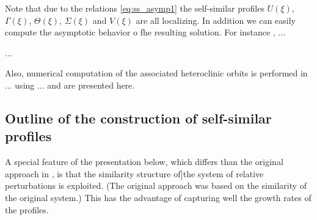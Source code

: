 \documentclass[a4paper,11pt]{article}
\theoremstyle{remark}
\begin{document}
Note that due to the relations \eqref{eq:ss_asymp1} the self-similar profiles $U(\xi)$, $\Gamma (\xi)$, $\Theta (\xi)$, $\Sigma(\xi)$ and $V(\xi)$ are all localizing.
In addition we can easily compute the asymptotic behavior o fhe resulting solution. For instance , ...

...

Also, numerical computation of the associated heteroclinic orbits is performed in ... using ... and are presented here.


\bigskip

\subsection{Outline of the construction of self-similar profiles}

A special feature of the presentation below, which differs than the original approach in \cite{LKT17}, is that the similarity structure of]the system of relative perturbations is exploited.
(The original approach was based on the similarity of the original system.) This has the advantage of capturing well the growth
rates of the profiles.
\end{document}
